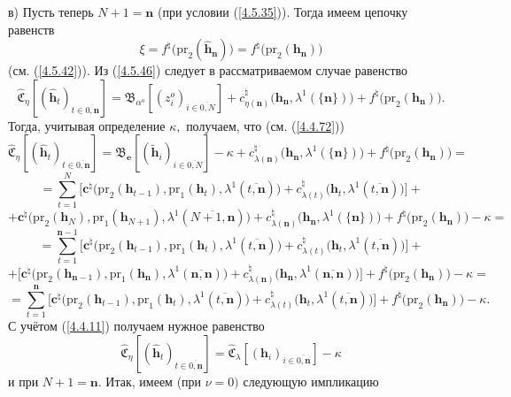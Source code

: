 \documentclass[11pt,twoside]{report}
\newcommand{\bfn}{\begin{equation}}
\newcommand{\efn}{\end{equation}}
\newcommand{\ov}{\overline}
\newcommand{\la}{\lambda}
\newcommand{\al}{\alpha}
\begin{document}
{{в) Пусть теперь $N+1 = \mathbf{n}$ (при  условии (\ref{4.5.35})). Тогда имеем цепочку равенств
\bfn\label{4.5.50}
\xi = f^\natural\bigl(\mathrm{pr}_2(\hat{\mathbf{h}}_\mathbf{n})\bigl) =
f^\natural\bigl(\mathrm{pr}_2(\mathbf{h}_\mathbf{n})\bigl)
\efn
(см. (\ref{4.5.42})). Из (\ref{4.5.46}) следует в рассматриваемом случае равенство
$$\widehat{\mathfrak{C}}_\eta[(\hat{\mathbf{h}}_t)_{t\in\ov{0,\mathbf{n}}}] =
\mathfrak{B}_{\al^o}[(z_i^o)_{i\in\ov{0,N}}] +
c_{\eta(\mathbf{n})}^\natural\bigl(\mathbf{h}_\mathbf{n},\la^1(\{\mathbf{n}\})\bigl) +
f^\natural\bigl(\mathrm{pr}_2(\mathbf{h}_\mathbf{n})\bigl).
$$
Тогда, учитывая определение $\kappa,$ получаем, что (см. (\ref{4.4.72}))
$$
\widehat{\mathfrak{C}}_\eta[(\hat{\mathbf{h}}_t)_{t\in\ov{0,\mathbf{n}}}] =
\mathfrak{B}_\mathbf{e}[(\tilde{\mathbf{h}}_i)_{i\in\ov{0,N}}] - \kappa +
c_{\la(\mathbf{n})}^\natural\bigl(\mathbf{h}_\mathbf{n},\la^1(\{\mathbf{n}\})\bigl) +
f^\natural\bigl(\mathrm{pr}_2(\mathbf{h}_\mathbf{n})\bigl) =
$$
$$
= \sum\limits_{t=1}^N\bigl[\mathbf{c}^\natural\bigl(\mathrm{pr}_2(\mathbf{h}_{t-1}),\mathrm{pr}_1
(\mathbf{h}_t), \la^1(\ov{t,\mathbf{n}})\bigl) + c_{\la(t)}^\natural\bigl(\mathbf{h}_t,
\la^1(\ov{t,\mathbf{n}})\bigl)\bigl] +
$$
$$
+ \mathbf{c}^\natural\bigl(\mathrm{pr}_2(\mathbf{h}_N),
\mathrm{pr}_1(\mathbf{h}_{N+1}),
\la^1(\ov{N+1,\mathbf{n}})\bigl) +
c_{\la(\mathbf{n})}^\natural\bigl(\mathbf{h}_\mathbf{n},\la^1 (\{\mathbf{n}\})\bigl) +
f^\natural\bigl(\mathrm{pr}_2(\mathbf{h}_\mathbf{n})\bigl) -\kappa =
$$
$$
=\sum\limits_{t=1}^{\mathbf{n}-1}\bigl[\mathbf{c}^\natural\bigl(\mathrm{pr}_2(\mathbf{h}_{t-1}),
\mathrm{pr}_1(\mathbf{h}_t), \la^1(\ov{t,\mathbf{n}})\bigl) +
c_{\la(t)}^\natural\bigl(\mathbf{h}_t,\la^1(\ov{t,\mathbf{n}})\bigl)\bigl] +
$$
$$
+\bigl[\mathbf{c}^\natural\bigl(\mathrm{pr}_2(\mathbf{h}_{\mathbf{n}-1}),\mathrm{pr}_1
(\mathbf{h}_\mathbf{n}),\la^1(\ov{\mathbf{n},\mathbf{n}})\bigl) +
c_{\la(\mathbf{n})}^\natural\bigl(\mathbf{h}_\mathbf{n},\la^1(\ov{\mathbf{n},\mathbf{n}})\bigl)\bigl] +
f^\natural\bigl(\mathrm{pr}_2(\mathbf{h}_\mathbf{n})\bigl) - \kappa =
$$
$$
= \sum\limits_{t=1}^\mathbf{n}\bigl[\mathbf{c}^\natural\bigl(\mathrm{pr}_2(\mathbf{h}_{t-1}),
\mathrm{pr}_1(\mathbf{h}_t),\la^1(\ov{t,\mathbf{n}})\bigl) +
c_{\la(t)}^\natural\bigl(\mathbf{h}_t,\la^1(\ov{t,\mathbf{n}})\bigl)\bigl]
+f^\natural\bigl(\mathrm{pr}_2(\mathbf{h}_\mathbf{n})\bigl) - \kappa.
$$
С учётом (\ref{4.4.11}) получаем нужное равенство
$$
\widehat{\mathfrak{C}}_\eta[(\hat{\mathbf{h}}_t)_{t\in\ov{0,\mathbf{n}}}] =
\widehat{\mathfrak{C}}_\la[(\mathbf{h}_i)_{i\in\ov{0,\mathbf{n}}}] - \kappa
$$
и при $N+1 = \mathbf{n}.$ Итак, имеем (при $\nu = 0)$ следующую импликацию
}}
\end{document}
